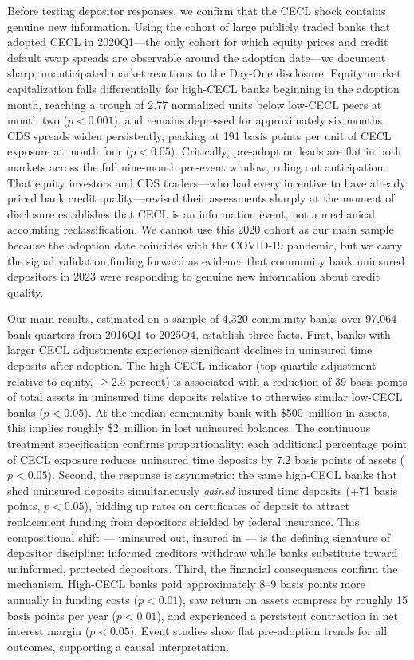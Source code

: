 Before testing depositor responses, we confirm that the CECL shock contains
genuine new information. Using the cohort of large publicly traded banks that
adopted CECL in 2020Q1---the only cohort for which equity prices and credit
default swap spreads are observable around the adoption date---we document sharp,
unanticipated market reactions to the Day-One disclosure. Equity market
capitalization falls differentially for high-CECL banks beginning in the adoption
month, reaching a trough of 2.77 normalized units below low-CECL peers at month
two ($p < 0.001$), and remains depressed for approximately six months. CDS
spreads widen persistently, peaking at 191 basis points per unit of CECL exposure
at month four ($p < 0.05$). Critically, pre-adoption leads are flat in both
markets across the full nine-month pre-event window, ruling out anticipation.
That equity investors and CDS traders---who had every incentive to have already
priced bank credit quality---revised their assessments sharply at the moment of
disclosure establishes that CECL is an information event, not a mechanical
accounting reclassification. We cannot use this 2020 cohort as our main sample
because the adoption date coincides with the COVID-19 pandemic, but we carry the
signal validation finding forward as evidence that community bank uninsured
depositors in 2023 were responding to genuine new information about credit
quality.

Our main results, estimated on a sample of 4,320 community banks over 97,064
bank-quarters from 2016Q1 to 2025Q4, establish three facts. First, banks with
larger CECL adjustments experience significant declines in uninsured time deposits
after adoption. The high-CECL indicator (top-quartile adjustment relative to
equity, $\geq 2.5$ percent) is associated with a reduction of 39 basis points of
total assets in uninsured time deposits relative to otherwise similar low-CECL
banks ($p < 0.05$). At the median community bank with \$500~million in assets,
this implies roughly \$2~million in lost uninsured balances. The continuous
treatment specification confirms proportionality: each additional percentage point
of CECL exposure reduces uninsured time deposits by 7.2 basis points of assets
($p < 0.05$). Second, the response is asymmetric: the same high-CECL banks that
shed uninsured deposits simultaneously \emph{gained} insured time deposits (+71
basis points, $p < 0.05$), bidding up rates on certificates of deposit to attract
replacement funding from depositors shielded by federal insurance. This
compositional shift --- uninsured out, insured in --- is the defining signature
of depositor discipline: informed creditors withdraw while banks substitute toward
uninformed, protected depositors. Third, the financial consequences confirm the
mechanism. High-CECL banks paid approximately 8--9 basis points more annually
in funding costs ($p < 0.01$), saw return on assets compress by roughly 15 basis
points per year ($p < 0.01$), and experienced a persistent contraction in net
interest margin ($p < 0.05$). Event studies show flat pre-adoption trends for all
outcomes, supporting a causal interpretation.

